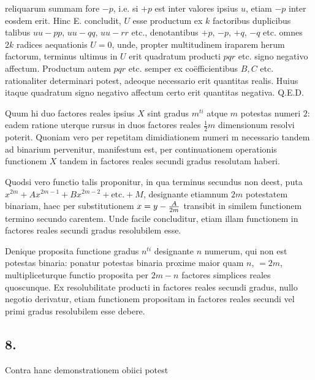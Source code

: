 \documentclass[twoside,12pt, showframe]{memoir}
\let\oldfrac\frac
\def\frac#1#2{\mathchoice{\tfrac{#1}{#2}}{\oldfrac{#1}{#2}}{\genfrac{}{}{}{2}{#1}{#2\mathstrut}}{\genfrac{}{}{}{3}{#1}{#2\mathstrut}}}
\begin{document}
reliquarum summam fore \(-p\), i.e. si \(+p\) est inter valores ipsius \(u\), etiam \(-p\) inter eosdem erit. Hinc \textsc{E.} concludit, \(U\) esse productum ex \(k\) factoribus duplicibus talibus \(uu - pp\), \(uu - qq\), \(uu - rr\) etc{.}, denotantibus \(+p\), \(-p\), \(+q\), \(-q\) etc{.} omnes \(2k\) radices aequationis \(U=0\),  unde, propter multitudinem iraparem herum factorum, terminus ultimus in \(U\) erit quadratum producti \(pqr\) etc{.} signo negativo affectum. Productum autem \(pqr\) etc{.} semper ex co\"efficientibus \(B, C\) etc{.} rationaliter determinari potest, adeoque necessario erit quantitas realis. Huius itaque quadratum signo negativo affectum certo erit quantitas negativa.   Q.E.D.

Quum hi duo factores reales ipsius \(X\) sint gradus \(m^{ti}\) atque \(m\) potestas numeri \(2\): eadem ratione uterque rursus in duos factores reales \(\tfrac{1}{2}m\) dimensionum resolvi poterit. Quoniam vero per repetitam dimidiationem numeri m necessario tandem ad binarium pervenitur, manifestum est, per continuationem operationis functionem \(X\) tandem in factores reales secundi gradus resolutam haberi.

Quodsi vero functio talis proponitur, in qua terminus secundus non deest, puta \(x^{2m} + A x^{2m-1} + B x^{2m-2} + \text{etc{.}} + M\), designante etiamnum \(2m\) potestatem binariam, haec per substitutionem \(x = y - \frac{A}{2m}\) transibit in similem functionem termino secundo carentem. Unde facile concluditur, etiam illam functionem in factores reales secundi gradus resolubilem esse.

Denique proposita functione gradus \(n^{ti}\) designante \(n\) numerum, qui non est potestas binaria: ponatur potestas binaria proxime maior quam \(n\), \(= 2m\), multipliceturque functio proposita per \(2 m - n\) factores simplices reales quoscunque. Ex resolubilitate producti in factores reales secundi gradus, nullo negotio derivatur, etiam functionem propositam in factores reales secundi vel primi gradus resolubilem esse debere.

\subsection*{8.}

Contra hanc demonstrationem obiici potest
\end{document}
